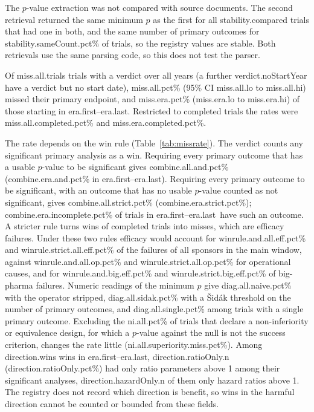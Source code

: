 \documentclass[11pt]{article}
\newcommand{\era}{\num{era.first}--\num{era.last}}
\begin{document}
The $p$-value extraction was not compared with source documents. The second retrieval returned the same minimum $p$ as the first for all \num{stability.compared} trials that had one in both, and the same number of primary outcomes for \num{stability.sameCount.pct}\% of trials, so the registry values are stable. Both retrievals use the same parsing code, so this does not test the parser.

Of \num{miss.all.trials} trials with a verdict over all years (a further \num{verdict.noStartYear} have a verdict but no start date), \num{miss.all.pct}\% (95\% CI \num{miss.all.lo} to \num{miss.all.hi}) missed their primary endpoint, and \num{miss.era.pct}\% (\num{miss.era.lo} to \num{miss.era.hi}) of those starting in \era. Restricted to completed trials the rates were \num{miss.all.completed.pct}\% and \num{miss.era.completed.pct}\%.

The rate depends on the win rule (Table~\ref{tab:missrate}). The verdict counts any significant primary analysis as a win. Requiring every primary outcome that has a usable $p$-value to be significant gives \num{combine.all.and.pct}\% (\num{combine.era.and.pct}\% in \era). Requiring every primary outcome to be significant, with an outcome that has no usable $p$-value counted as not significant, gives \num{combine.all.strict.pct}\% (\num{combine.era.strict.pct}\%); \num{combine.era.incomplete.pct}\% of trials in \era\ have such an outcome. A stricter rule turns wins of completed trials into misses, which are efficacy failures. Under these two rules efficacy would account for \num{winrule.and.all.eff.pct}\% and \num{winrule.strict.all.eff.pct}\% of the failures of all sponsors in the main window, against \num{winrule.and.all.op.pct}\% and \num{winrule.strict.all.op.pct}\% for operational causes, and for \num{winrule.and.big.eff.pct}\% and \num{winrule.strict.big.eff.pct}\% of big-pharma failures. Numeric readings of the minimum $p$ give \num{diag.all.naive.pct}\% with the operator stripped, \num{diag.all.sidak.pct}\% with a \v{S}id\'ak threshold on the number of primary outcomes, and \num{diag.all.single.pct}\% among trials with a single primary outcome. Excluding the \num{ni.all.pct}\% of trials that declare a non-inferiority or equivalence design, for which a $p$-value against the null is not the success criterion, changes the rate little (\num{ni.all.superiority.miss.pct}\%). Among \num{direction.wins} wins in \era, \num{direction.ratioOnly.n} (\num{direction.ratioOnly.pct}\%) had only ratio parameters above 1 among their significant analyses, \num{direction.hazardOnly.n} of them only hazard ratios above 1. The registry does not record which direction is benefit, so wins in the harmful direction cannot be counted or bounded from these fields.
\end{document}
